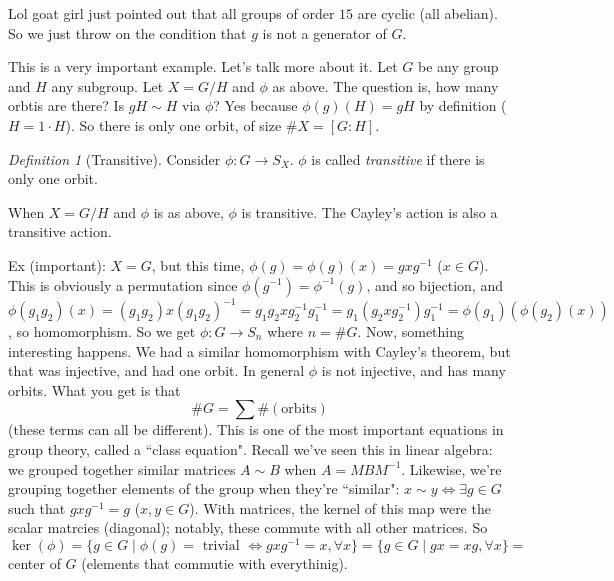 \documentclass{article}
\theoremstyle{plain}
\theoremstyle{remark}
\newtheorem{definition}{Definition}
\begin{document}
Lol goat girl just pointed out that all groups of order $15$ are cyclic
(all abelian).
So we just throw on the condition that $g$ is not a generator of $G$.

This is a very important example.
Let's talk more about it.
Let $G$ be any group and $H$ any subgroup.
Let $X = G/H$ and $\phi$ as above.
The question is, how many orbtis are there?
Is $gH \sim H$ via $\phi$?
Yes because $\phi(g)(H) = gH$ by definition ($H = 1\cdot H$).
So there is only one orbit, of size $\# X = [G:H]$.
\begin{definition}[Transitive]
	Consider $\phi \colon G \to S_X$.
	$\phi$ is called \emph{transitive}
	if there is only one orbit.
\end{definition}
When $X = G/H$ and $\phi$ is as above, $\phi$ is transitive.
The Cayley's action is also a transitive action.

Ex (important):
$X = G$, but this time, $\phi(g) = \phi(g)(x) = gxg^{-1}$ ($x \in G$).
This is obviously a permutation since $\phi(g^{-1}) = \phi^{-1}(g)$,
and so bijection,
and $\phi(g_1g_2)(x) = (g_1g_2)x(g_1g_2)^{-1} = g_1g_2xg_2^{-1}g_1^{-1}
= g_1(g_2xg_2^{-1})g_1^{-1} = \phi(g_1)(\phi(g_2)(x))$,
so homomorphism.
So we get $\phi \colon G \to S_n$ where $n = \# G$.
Now, something interesting happens.
We had a similar homomorphism with Cayley's theorem,
but that was injective, and had one orbit.
In general $\phi$ is not injective, and has many orbits.
What you get is that
\[
	\# G = \sum\#(\text{orbits})
\]
(these terms can all be different).
This is one of the most important equations in group theory,
called a ``class equation".
Recall we've seen this in linear algebra:
we grouped together similar matrices $A \sim B$ when $A = MBM^{-1}$.
Likewise, we're grouping together elements of the group when they're ``similar":
$x \sim y \iff \exists g \in G$ such that $gxg^{-1} = g$ ($x,y \in G$).
With matrices, the kernel of this map were the scalar matrcies
(diagonal);
notably, these commute with all other matrices.
So $\ker(\phi) = \{g \in G \mid \phi(g) = \text{ trivial }
\iff gxg^{-1} = x, \forall x\}
= \{g \in G \mid gx = xg, \forall x\} =$
center of $G$ (elements that commutie with everythinig).
\end{document}
